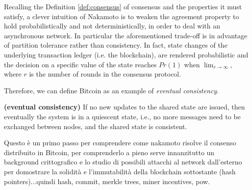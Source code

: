 \bigskip
\noindent
Recalling the Definition \ref{def:consensus} of consensus and the properties it must satisfy, a clever intuition of Nakamoto is to weaken the agreement property to hold probabilistically and not deterministically, in order to deal with an asynchronous network. In particular the aforementioned trade-off is in advantage of partition tolerance rather than consistency. In fact, state changes of the underlying transaction ledger (i.e. the blockchain), are rendered probabilistic and the decision on a specific value of the state reaches $Pr(1)$ when $\lim_{r \to \infty}$, where $r$ is the number of rounds in the consensus protocol.

\bigskip
\noindent
Therefore, we can define Bitcoin as an example of \textit{eventual consistency}.
\begin{mydef}{\bf (eventual consistency)}
    If no new updates to the shared state are issued, then eventually the system is in a quiescent state, i.e., no more messages need to be exchanged between nodes, and the shared state is consistent.
\end{mydef}

\bigskip
\noindent
Questo è un primo passo per comprendere come nakamoto risolve il consenso distribuito in Bitcoin, per comprenderlo a pieno serve innanzitutto un background crittografico e lo studio di possibili attacchi al network dall'esterno per domostrare la solidità e l'immutabilità della blockchain sottostante (hash pointers)...quindi hash, commit, merkle trees, miner incentives, pow.
